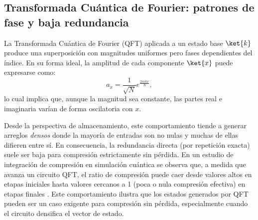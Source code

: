 \subsection{Transformada Cuántica de Fourier: patrones de fase y baja redundancia}
\label{subsec:patrones_qft}

La Transformada Cuántica de Fourier (QFT) aplicada a un estado base $\ket{k}$ produce una superposición con magnitudes uniformes pero fases dependientes del índice. En su forma ideal, la amplitud de cada componente $\ket{x}$ puede expresarse como:
\[
a_x = \frac{1}{\sqrt{N}} e^{\frac{2\pi i k x}{N}},
\]
lo cual implica que, aunque la magnitud sea constante, las partes real e imaginaria varían de forma oscilatoria con $x$.

Desde la perspectiva de almacenamiento, este comportamiento tiende a generar arreglos \textit{densos} donde la mayoría de entradas son no nulas y muchas de ellas difieren entre sí. En consecuencia, la redundancia directa (por repetición exacta) suele ser baja para compresión estrictamente sin pérdida. En un estudio de integración de compresión en simulación cuántica se observa que, a medida que avanza un circuito QFT, el ratio de compresión puede caer desde valores altos en etapas iniciales hasta valores cercanos a 1 (poca o nula compresión efectiva) en etapas finales \cite{wu2018_sc18_aalc}. Este comportamiento ilustra que los estados generados por QFT pueden ser un caso exigente para compresión sin pérdida, especialmente cuando el circuito densifica el vector de estado.
